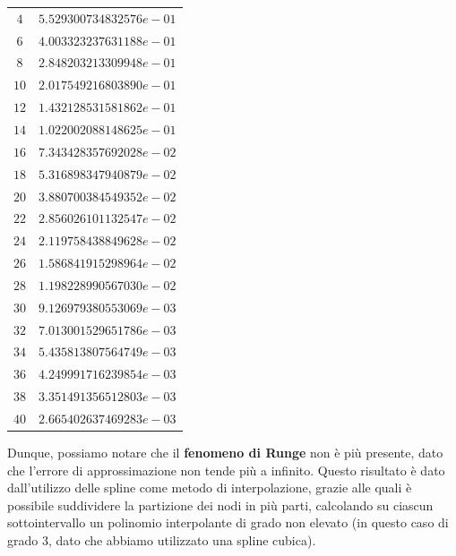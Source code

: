 \begin{table}[H]
\begin{minipage}{0.5\textwidth}
\begin{tabular}{|c|c|}
			$4$  & $5.529300734832576e-01$ \\ 
			$6$  & $4.003323237631188e-01$ \\ 
			$8$  & $2.848203213309948e-01$ \\ 
			$10$ & $2.017549216803890e-01$ \\ 
			$12$ & $1.432128531581862e-01$ \\ 
			$14$ & $1.022002088148625e-01$ \\ 
			$16$ & $7.343428357692028e-02$ \\ 
			$18$ & $5.316898347940879e-02$ \\ 
			$20$ & $3.880700384549352e-02$ \\ 
			$22$ & $2.856026101132547e-02$ \\ 
			$24$ & $2.119758438849628e-02$ \\ 
			$26$ & $1.586841915298964e-02$ \\ 
			$28$ & $1.198228990567030e-02$ \\ 
			$30$ & $9.126979380553069e-03$ \\ 
			$32$ & $7.013001529651786e-03$ \\ 
			$34$ & $5.435813807564749e-03$ \\ 
			$36$ & $4.249991716239854e-03$ \\ 
			$38$ & $3.351491356512803e-03$ \\ 
			$40$ & $2.665402637469283e-03$ \\ 
			\hline
		\end{tabular}
	\end{minipage}
\end{table}

Dunque, possiamo notare che il \textbf{fenomeno di Runge} non è più presente, dato che l'errore di approssimazione non tende più a infinito. Questo risultato è dato
dall'utilizzo delle spline come metodo di interpolazione, grazie alle quali è possibile suddividere la partizione dei nodi in più parti, calcolando su
ciascun sottointervallo un polinomio interpolante di grado non elevato (in questo caso di grado 3, dato che abbiamo utilizzato una spline cubica).
